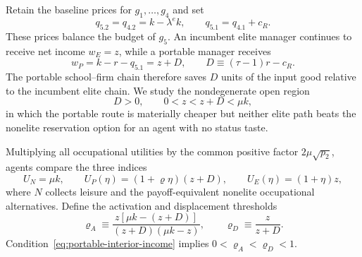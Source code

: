 \documentclass[12pt,letterpaper]{article}
\theoremstyle{definition}
\begin{document}
Retain the baseline prices for $g_1,\ldots,g_4$ and set
\begin{equation}\label{eq:portable-prices}
  q_{5.2}=q_{4.2}=k-\lambda^e k,
  \qquad
  q_{5.1}=q_{4.1}+c_R .
\end{equation}
These prices balance the budget of $g_5$.
An incumbent elite manager continues to receive net income $w_E=z$, while a portable
manager receives
\begin{equation}\label{eq:portable-advantage}
  w_P
  =
  k-r-q_{5.1}
  =
  z+D,
  \qquad
  D\equiv(\tau-1)r-c_R .
\end{equation}
The portable school--firm chain therefore saves $D$ units of the input good relative to
the incumbent elite chain.
We study the nondegenerate open region
\begin{equation}\label{eq:portable-interior-income}
  D>0,
  \qquad
  0<z<z+D<\mu k,
\end{equation}
in which the portable route is materially cheaper but neither elite path beats the
nonelite reservation option for an agent with no status taste.

Multiplying all occupational utilities by the common positive factor
$2\mu\sqrt{p_2}$, agents compare the three indices
\begin{equation}\label{eq:portable-indices}
  U_N=\mu k,
  \qquad
  U_P(\eta)=(1+\varrho\eta)(z+D),
  \qquad
  U_E(\eta)=(1+\eta)z ,
\end{equation}
where $N$ collects leisure and the payoff-equivalent nonelite occupational
alternatives.
Define the activation and displacement thresholds
\begin{equation}\label{eq:recognition-thresholds}
  \varrho_A
  \equiv
  \frac{z[\mu k-(z+D)]}{(z+D)(\mu k-z)},
  \qquad
  \varrho_D
  \equiv
  \frac{z}{z+D}.
\end{equation}
Condition~\eqref{eq:portable-interior-income} implies
$0<\varrho_A<\varrho_D<1$.
\end{document}
